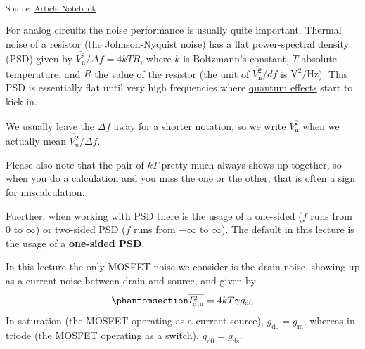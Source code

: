 \documentclass[
  a4paper,
  DIV=11,
  numbers=noendperiod]{scrartcl}
\begin{document}
\textsubscript{Source:
\href{https://iic-jku.github.io/analog-circuit-design/index.qmd.html}{Article
Notebook}}

For analog circuits the noise performance is usually quite important.
Thermal noise of a resistor (the Johnson-Nyquist noise) has a flat
power-spectral density (PSD) given by
\(\overline{V_\mathrm{n}^2}/\Delta f = 4 k T R\), where \(k\) is
Boltzmann's constant, \(T\) absolute temperature, and \(R\) the value of
the resistor (the unit of \(\overline{V_\mathrm{n}^2}/df\) is
\(\text{V}^2/\text{Hz}\)). This PSD is essentially flat until very high
frequencies where
\href{https://en.wikipedia.org/wiki/Johnson–Nyquist_noise}{quantum
effects} start to kick in.

\begin{tcolorbox}[enhanced jigsaw, colframe=quarto-callout-note-color-frame, opacityback=0, breakable, toptitle=1mm, left=2mm, rightrule=.15mm, titlerule=0mm, arc=.35mm, toprule=.15mm, bottomrule=.15mm, colbacktitle=quarto-callout-note-color!10!white, bottomtitle=1mm, colback=white, title=\textcolor{quarto-callout-note-color}{\faInfo}\hspace{0.5em}{Note}, coltitle=black, leftrule=.75mm, opacitybacktitle=0.6]

We usually leave the \(\Delta f\) away for a shorter notation, so we
write \(\overline{V_\mathrm{n}^2}\) when we actually mean
\(\overline{V_\mathrm{n}^2}/\Delta f\).

Please also note that the pair of \(k T\) pretty much always shows up
together, so when you do a calculation and you miss the one or the
other, that is often a sign for miscalculation.

Fuerther, when working with PSD there is the usage of a one-sided (\(f\)
runs from \(0\) to \(\infty\)) or two-sided PSD (\(f\) runs from
\(-\infty\) to \(\infty\)). The default in this lecture is the usage of
a \textbf{one-sided PSD}.

\end{tcolorbox}

In this lecture the only MOSFET noise we consider is the drain noise,
showing up as a current noise between drain and source, and given by
\begin{equation}\phantomsection\label{eq-mosfet-noise}{
\overline{I_\mathrm{d,n}^2} = 4 k T \gamma g_\mathrm{d0}
}\end{equation} In saturation (the MOSFET operating as a current
source), \(g_\mathrm{d0} = g_\mathrm{m}\), whereas in triode (the MOSFET
operating as a switch), \(g_\mathrm{d0} = g_\mathrm{ds}\).
\end{document}
